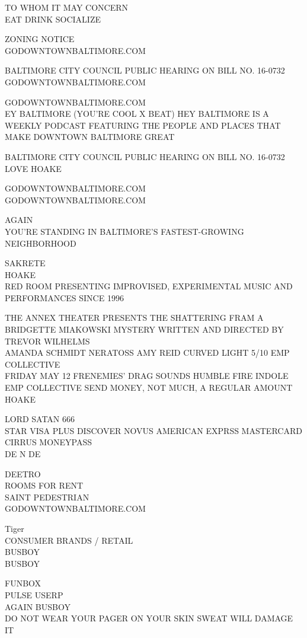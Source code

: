 \documentclass[10pt,letterpaper]{article}
\begin{document}
TO WHOM IT MAY CONCERN\\
EAT DRINK SOCIALIZE

ZONING NOTICE\\
GODOWNTOWNBALTIMORE.COM

BALTIMORE CITY COUNCIL PUBLIC HEARING ON BILL NO. 16{-}0732\\
GODOWNTOWNBALTIMORE.COM

GODOWNTOWNBALTIMORE.COM\\
EY BALTIMORE (YOU'RE COOL X BEAT) HEY BALTIMORE IS A WEEKLY PODCAST FEATURING THE PEOPLE AND PLACES THAT MAKE DOWNTOWN BALTIMORE GREAT

BALTIMORE CITY COUNCIL PUBLIC HEARING ON BILL NO. 16{-}0732\\
LOVE HOAKE

GODOWNTOWNBALTIMORE.COM\\
GODOWNTOWNBALTIMORE.COM

AGAIN\\
YOU'RE STANDING IN BALTIMORE'S FASTEST{-}GROWING NEIGHBORHOOD

SAKRETE\\
HOAKE\\
RED ROOM PRESENTING IMPROVISED, EXPERIMENTAL MUSIC AND PERFORMANCES SINCE 1996

THE ANNEX THEATER PRESENTS THE SHATTERING FRAM A BRIDGETTE MIAKOWSKI MYSTERY WRITTEN AND DIRECTED BY TREVOR WILHELMS\\
AMANDA SCHMIDT NERATOSS AMY REID CURVED LIGHT 5/10 EMP COLLECTIVE\\
FRIDAY MAY 12 FRENEMIES' DRAG SOUNDS HUMBLE FIRE INDOLE EMP COLLECTIVE SEND MONEY, NOT MUCH, A REGULAR AMOUNT\\
HOAKE

LORD SATAN 666\\
STAR VISA PLUS DISCOVER NOVUS AMERICAN EXPRSS MASTERCARD CIRRUS MONEYPASS\\
DE N DE

DEETRO\\
ROOMS FOR RENT\\
SAINT PEDESTRIAN\\
GODOWNTOWNBALTIMORE.COM

Tiger\\
CONSUMER BRANDS / RETAIL\\
BUSBOY\\
BUSBOY

FUNBOX\\
PULSE USERP\\
AGAIN BUSBOY\\
DO NOT WEAR YOUR PAGER ON YOUR SKIN SWEAT WILL DAMAGE IT
\end{document}
